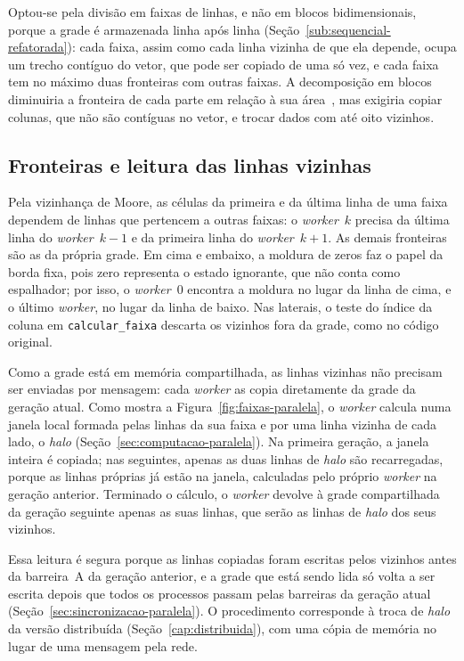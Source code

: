 Optou-se pela divisão em faixas de linhas, e não em blocos bidimensionais, porque a grade é armazenada linha após linha (Seção~\ref{sub:sequencial-refatorada}): cada faixa, assim como cada linha vizinha de que ela depende, ocupa um trecho contíguo do vetor, que pode ser copiado de uma só vez, e cada faixa tem no máximo duas fronteiras com outras faixas. A decomposição em blocos diminuiria a fronteira de cada parte em relação à sua área~\cite{Foster1995}, mas exigiria copiar colunas, que não são contíguas no vetor, e trocar dados com até oito vizinhos.

\subsection{Fronteiras e leitura das linhas vizinhas}\label{sub:halo-paralela}

Pela vizinhança de Moore, as células da primeira e da última linha de uma faixa dependem de linhas que pertencem a outras faixas: o \textit{worker}~$k$ precisa da última linha do \textit{worker}~$k-1$ e da primeira linha do \textit{worker}~$k+1$. As demais fronteiras são as da própria grade. Em cima e embaixo, a moldura de zeros faz o papel da borda fixa, pois zero representa o estado ignorante, que não conta como espalhador; por isso, o \textit{worker}~0 encontra a moldura no lugar da linha de cima, e o último \textit{worker}, no lugar da linha de baixo. Nas laterais, o teste do índice da coluna em \texttt{calcular\_faixa} descarta os vizinhos fora da grade, como no código original.

Como a grade está em memória compartilhada, as linhas vizinhas não precisam ser enviadas por mensagem: cada \textit{worker} as copia diretamente da grade da geração atual. Como mostra a Figura~\ref{fig:faixas-paralela}, o \textit{worker} calcula numa janela local formada pelas linhas da sua faixa e por uma linha vizinha de cada lado, o \textit{halo} (Seção~\ref{sec:computacao-paralela}). Na primeira geração, a janela inteira é copiada; nas seguintes, apenas as duas linhas de \textit{halo} são recarregadas, porque as linhas próprias já estão na janela, calculadas pelo próprio \textit{worker} na geração anterior. Terminado o cálculo, o \textit{worker} devolve à grade compartilhada da geração seguinte apenas as suas linhas, que serão as linhas de \textit{halo} dos seus vizinhos.

Essa leitura é segura porque as linhas copiadas foram escritas pelos vizinhos antes da barreira~A da geração anterior, e a grade que está sendo lida só volta a ser escrita depois que todos os processos passam pelas barreiras da geração atual (Seção~\ref{sec:sincronizacao-paralela}). O procedimento corresponde à troca de \textit{halo} da versão distribuída (Seção~\ref{cap:distribuida}), com uma cópia de memória no lugar de uma mensagem pela rede.


